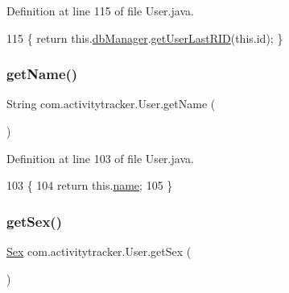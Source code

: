 Definition at line 115 of file User.\+java.


\begin{DoxyCode}
115 \{ \textcolor{keywordflow}{return} this.\mbox{\hyperlink{classcom_1_1activitytracker_1_1_user_a8c8b36433447a235f2b4940b92e839c1}{dbManager}}.\mbox{\hyperlink{classcom_1_1activitytracker_1_1_d_b_manager_aab14c61b3f3a17bdea10cab1b5fd9337}{getUserLastRID}}(this.\textcolor{keywordtype}{id}); \}
\end{DoxyCode}
\mbox{\label{classcom_1_1activitytracker_1_1_user_a6b39e49a1e49279035fd61a667d14f64}} 
\subsubsection{\texorpdfstring{get\+Name()}{getName()}}
{\footnotesize\ttfamily String com.\+activitytracker.\+User.\+get\+Name (\begin{DoxyParamCaption}{ }\end{DoxyParamCaption})}



Definition at line 103 of file User.\+java.


\begin{DoxyCode}
103                             \{
104         \textcolor{keywordflow}{return} this.\mbox{\hyperlink{classcom_1_1activitytracker_1_1_user_a49bfb4c8ebf8b7a377df01b5f0b2d7bc}{name}};
105     \}
\end{DoxyCode}
\mbox{\label{classcom_1_1activitytracker_1_1_user_ac184fdb794730df3fedf3b147283a5fd}} 
\subsubsection{\texorpdfstring{get\+Sex()}{getSex()}}
{\footnotesize\ttfamily \mbox{\hyperlink{enumcom_1_1activitytracker_1_1_user_1_1_sex}{Sex}} com.\+activitytracker.\+User.\+get\+Sex (\begin{DoxyParamCaption}{ }\end{DoxyParamCaption})}



